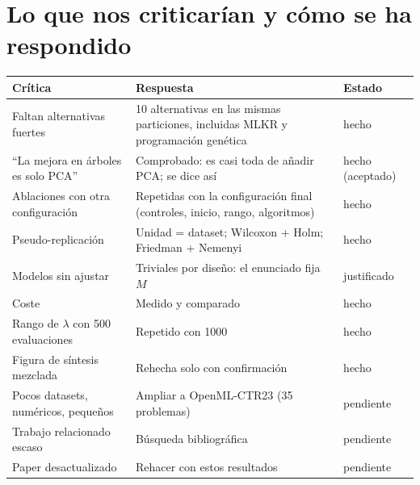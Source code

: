 \documentclass[apuntes]{uc3mmaster}
\begin{document}
\section{Lo que nos criticarían y cómo se ha respondido}\label{sec:criticas}
\begin{table}[h]\centering\small\setlength{\tabcolsep}{4pt}
\begin{tabular}{@{}p{4.3cm}p{6.6cm}p{2.6cm}@{}}\toprule
Crítica & Respuesta & Estado\\\midrule
Faltan alternativas fuertes & 10 alternativas en las mismas particiones, incluidas MLKR y programación genética & hecho\\
``La mejora en árboles es solo PCA'' & Comprobado: es casi toda de añadir PCA; se dice así & hecho (aceptado)\\
Ablaciones con otra configuración & Repetidas con la configuración final (controles, inicio, rango, algoritmos) & hecho\\
Pseudo-replicación & Unidad = dataset; Wilcoxon + Holm; Friedman + Nemenyi & hecho\\
Modelos sin ajustar & Triviales por diseño: el enunciado fija $M$ & justificado\\
Coste & Medido y comparado & hecho\\
Rango de $\lambda$ con 500 evaluaciones & Repetido con 1000 & hecho\\
Figura de síntesis mezclada & Rehecha solo con confirmación & hecho\\
Pocos datasets, numéricos, pequeños & Ampliar a OpenML-CTR23 (35 problemas) & pendiente\\
Trabajo relacionado escaso & Búsqueda bibliográfica & pendiente\\
Paper desactualizado & Rehacer con estos resultados & pendiente\\\bottomrule
\end{tabular}
\end{table}

\end{document}
